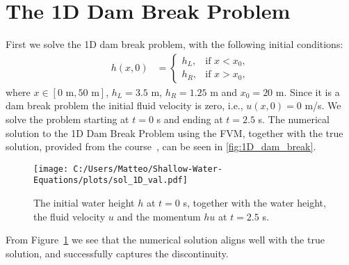 \section{The 1D Dam Break Problem}
First we solve the 1D dam break problem, with the following initial conditions:
\begin{align*}
    h(x,0) &= \begin{cases}
        h_L, & \text{if } x < x_0, \\
        h_R, & \text{if } x > x_0,
    \end{cases} 
\end{align*}
where $x \in [0 \text{ m}, 50 \text{ m}]$, $h_L = 3.5$ m, $h_R = 1.25$ m and $x_0 = 20$ m.
Since it is a dam break problem the initial fluid velocity is zero, i.e., $u(x,0) = 0$ m/s.
We solve the problem starting at $t=0$ s and ending at $t=2.5$ s.
The numerical solution to the 1D Dam Break Problem using the FVM, together with the true solution, provided from the course~\cite{phd_corse_2009}, can be seen in \autoref{fig:1D_dam_break}.
\begin{figure}[H]
    \centering
    \texttt{[image: C:/Users/Matteo/Shallow-Water-Equations/plots/sol\_1D\_val.pdf]}
    \caption{The initial water height $h$ at $t=0$ s, together with the water height, the fluid velocity $u$ and the momentum $hu$ at $t=2.5$ s.}\label{fig:1D_dam_break}
\end{figure}
From Figure~\ref{fig:1D_dam_break} we see that the numerical solution aligns well with the true solution, and successfully captures the discontinuity.


